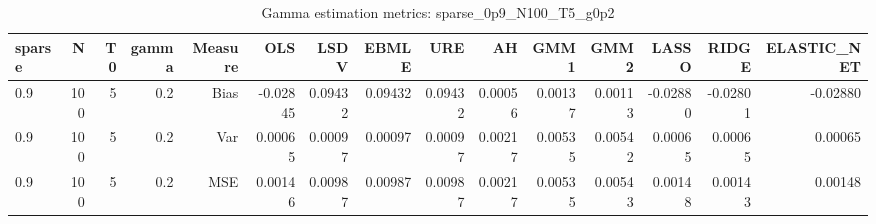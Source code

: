 \begin{table}[!htbp]\centering
\caption{Gamma estimation metrics: sparse_0p9_N100_T5_g0p2}
\label{tab:table1_sparse_0p9_N100_T5_g0p2}
\begin{tabular}{lrrrrrrrrrrrrrr}
\hline
sparse & N & T0 & gamma & Measure & OLS & LSDV & EBMLE & URE & AH & GMM1 & GMM2 & LASSO & RIDGE & ELASTIC_NET \\
\hline
0.9 & 100 & 5 & 0.2 & Bias & -0.02845 & 0.09432 & 0.09432 & 0.09432 & 0.00056 & 0.00137 & 0.00113 & -0.02880 & -0.02801 & -0.02880 \\
0.9 & 100 & 5 & 0.2 & Var & 0.00065 & 0.00097 & 0.00097 & 0.00097 & 0.00217 & 0.00535 & 0.00542 & 0.00065 & 0.00065 & 0.00065 \\
0.9 & 100 & 5 & 0.2 & MSE & 0.00146 & 0.00987 & 0.00987 & 0.00987 & 0.00217 & 0.00535 & 0.00543 & 0.00148 & 0.00143 & 0.00148 \\
\hline
\end{tabular}
\end{table}


